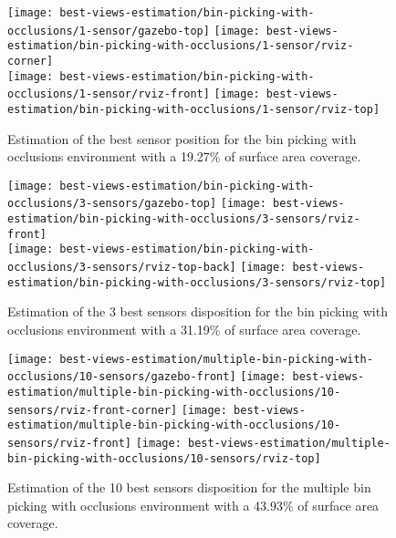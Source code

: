\begin{figure}
	\centering
	\texttt{[image: best-views-estimation/bin-picking-with-occlusions/1-sensor/gazebo-top]}\hspace{2em}
	\texttt{[image: best-views-estimation/bin-picking-with-occlusions/1-sensor/rviz-corner]}\\
	\texttt{[image: best-views-estimation/bin-picking-with-occlusions/1-sensor/rviz-front]}\hspace{2em}
	\texttt{[image: best-views-estimation/bin-picking-with-occlusions/1-sensor/rviz-top]}
	\caption{Estimation of the best sensor position for the bin picking with occlusions environment with a 19.27\% of surface area coverage.}
	\label{fig:bin-picking-with-occlusions-1-sensor}
\end{figure}

\begin{figure}
	\centering
	\texttt{[image: best-views-estimation/bin-picking-with-occlusions/3-sensors/gazebo-top]}\hspace{2em}
	\texttt{[image: best-views-estimation/bin-picking-with-occlusions/3-sensors/rviz-front]}\\
	\texttt{[image: best-views-estimation/bin-picking-with-occlusions/3-sensors/rviz-top-back]}\hspace{2em}
	\texttt{[image: best-views-estimation/bin-picking-with-occlusions/3-sensors/rviz-top]}
	\caption{Estimation of the 3 best sensors disposition for the bin picking with occlusions environment with a 31.19\% of surface area coverage.}
	\label{fig:bin-picking-with-occlusions-3-sensors}
\end{figure}

\begin{figure}
	\centering
	\texttt{[image: best-views-estimation/multiple-bin-picking-with-occlusions/10-sensors/gazebo-front]}\vspace{2em}
	\texttt{[image: best-views-estimation/multiple-bin-picking-with-occlusions/10-sensors/rviz-front-corner]}\vspace{2em}
	\texttt{[image: best-views-estimation/multiple-bin-picking-with-occlusions/10-sensors/rviz-front]}\vspace{2em}
	\texttt{[image: best-views-estimation/multiple-bin-picking-with-occlusions/10-sensors/rviz-top]}
	\caption{Estimation of the 10 best sensors disposition for the multiple bin picking with occlusions environment with a 43.93\% of surface area coverage.}
	\label{fig:multiple-bin-picking-with-occlusions-10-sensors}
\end{figure}
